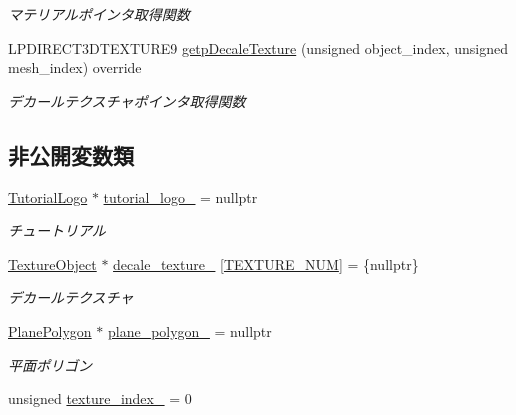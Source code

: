 \begin{DoxyCompactItemize}
\begin{DoxyCompactList}\small\item\em マテリアルポインタ取得関数 \end{DoxyCompactList}\item 
L\+P\+D\+I\+R\+E\+C\+T3\+D\+T\+E\+X\+T\+U\+R\+E9 \mbox{\hyperlink{class_tutorial_logo_draw_abf06755b745dc62341a817a58d377659}{getp\+Decale\+Texture}} (unsigned object\+\_\+index, unsigned mesh\+\_\+index) override
\begin{DoxyCompactList}\small\item\em デカールテクスチャポインタ取得関数 \end{DoxyCompactList}\end{DoxyCompactItemize}
\subsection*{非公開変数類}
\begin{DoxyCompactItemize}
\item 
\mbox{\hyperlink{class_tutorial_logo}{Tutorial\+Logo}} $\ast$ \mbox{\hyperlink{class_tutorial_logo_draw_ab357c25048d3582466a24234896adf3f}{tutorial\+\_\+logo\+\_\+}} = nullptr
\begin{DoxyCompactList}\small\item\em チュートリアル \end{DoxyCompactList}\item 
\mbox{\hyperlink{class_texture_object}{Texture\+Object}} $\ast$ \mbox{\hyperlink{class_tutorial_logo_draw_afb10b575221308bfb7f86e276086aad6}{decale\+\_\+texture\+\_\+}} \mbox{[}\mbox{\hyperlink{class_tutorial_logo_draw_aff3396323c386d499aa23e5605085ab1}{T\+E\+X\+T\+U\+R\+E\+\_\+\+N\+UM}}\mbox{]} = \{nullptr\}
\begin{DoxyCompactList}\small\item\em デカールテクスチャ \end{DoxyCompactList}\item 
\mbox{\hyperlink{class_plane_polygon}{Plane\+Polygon}} $\ast$ \mbox{\hyperlink{class_tutorial_logo_draw_adc447c252db2d9ab17d72eb783d82432}{plane\+\_\+polygon\+\_\+}} = nullptr
\begin{DoxyCompactList}\small\item\em 平面ポリゴン \end{DoxyCompactList}\item 
unsigned \mbox{\hyperlink{class_tutorial_logo_draw_a1f1d3ebf495bba7bfd86f7b415106144}{texture\+\_\+index\+\_\+}} = 0
\end{DoxyCompactItemize}
